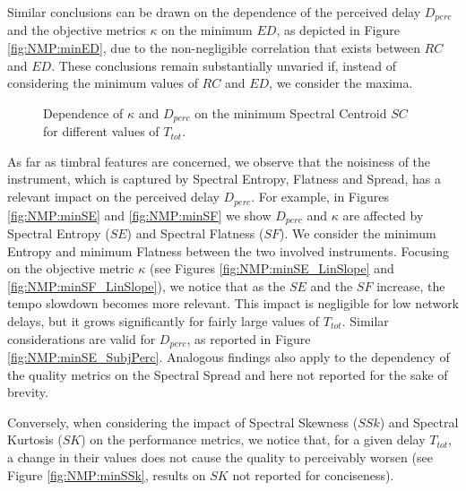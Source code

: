 Similar conclusions can be drawn on the dependence of the perceived delay $D_{perc}$ and the objective metrics $\kappa$ on the minimum $ED$, as depicted in Figure \ref{fig:NMP:minED}, due to the non-negligible correlation that exists between $RC$ and $ED$. 
These conclusions remain substantially unvaried if, instead of considering the minimum values of $RC$ and $ED$, we consider the maxima.

\begin{figure}[!tb]
\begin{flushright}
    \hfil
\end{flushright}
\caption{Dependence of $\kappa$ and $D_{perc}$ on the minimum Spectral Centroid $SC$ for different values of $T_{tot}$.}
\label{fig:NMP:minSC}
\end{figure}



As far as timbral features are concerned, we observe that the noisiness of the instrument, which is captured by Spectral Entropy, Flatness and Spread, has a relevant impact on the perceived delay $D_{perc}$. For example, in Figures \ref{fig:NMP:minSE} and \ref{fig:NMP:minSF} we show $D_{perc}$ and $\kappa$ are affected by Spectral Entropy ($SE$) and Spectral Flatness ($SF$). We consider the minimum Entropy and minimum Flatness between the two involved instruments. Focusing on the objective metric $\kappa$ (see Figures \ref{fig:NMP:minSE_LinSlope} and \ref{fig:NMP:minSF_LinSlope}), we notice that as the $SE$ and the $SF$ increase, the tempo slowdown becomes more relevant. This impact is negligible for low network delays, but it grows significantly for fairly large values of $T_{tot}$. Similar considerations are valid for $D_{perc}$, as reported in Figure \ref{fig:NMP:minSE_SubjPerc}. Analogous findings also apply to the dependency of the quality metrics on the Spectral Spread and here not reported for the sake of brevity.  

Conversely, when considering the impact of Spectral Skewness ($SSk$) and Spectral Kurtosis ($SK$) on the performance metrics, we notice that, for a given delay $T_{tot}$, a change in their values does not cause the quality to perceivably worsen (see Figure \ref{fig:NMP:minSSk}, results on $SK$ not reported for conciseness). 

